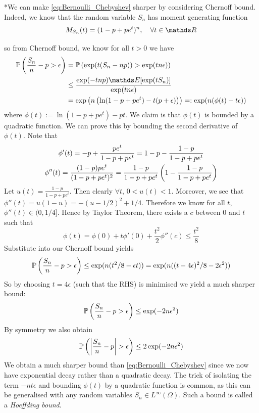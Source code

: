 \begin{unexaminable}
\begin{remark}
*We can make \eqref{eq:Bernoulli_Chebyshev} sharper by considering Chernoff bound. Indeed, we know that the random variable $S_n$ has moment generating function
\begin{equation}
    M_{S_n}(t) = (1-p+pe^t)^n, \quad \forall t \in \R
\end{equation}

so from Chernoff bound, we know for all $t>0$ we have
\begin{align*}
    \p\bracket{\frac{S_n}{n} - p > \epsilon} &= \p\bracket{\exp(t(S_n - np)) > \exp(tn\epsilon)} \\
    &\leq \frac{\exp(-tnp)\E[\exp(tS_n)]}{\exp(tn\epsilon)} \\
    &= \exp\bracket{n \bracket{\ln(1-p+pe^t) - t(p+\epsilon)}} =: \exp(n(\phi(t)-t\epsilon))
\end{align*}
where $\phi(t):= \ln(1-p+pe^t) - pt$. We claim is that $\phi(t)$ is bounded by a quadratic function. We can prove this by bounding the second derivative of $\phi(t)$. Note that
\begin{gather}
    \phi'(t) = -p + \frac{pe^t}{1-p+pe^t} = 1-p-\frac{1-p}{1-p+pe^t} \\
    \phi''(t) = \frac{(1-p)pe^t}{(1-p+pe^t)^2} = \frac{1-p}{1-p+pe^t}\left( 1-\frac{1-p}{1-p+pe^t} \right)
\end{gather}
Let $\displaystyle{u(t) = \frac{1-p}{1-p+pe^t}}$. Then clearly $\forall t, \, 0 < u(t) < 1$. Moreover, we see that $\phi''(t) = u(1-u) = -(u-1/2)^2 + 1/4$. Therefore we know for all $t$, $\phi''(t) \in (0,1/4]$. Hence by Taylor Theorem, there exists a $c$ between $0$ and $t$ such that
\begin{equation}
    \phi(t) = \phi(0) + t\phi'(0) + \frac{t^2}{2}\phi''(c) \leq \frac{t^2}{8} 
\end{equation}
Substitute into our Chernoff bound yields
\begin{equation}
    \mathbb{P}\left( \frac{S_n}{n} - p > \epsilon \right) \leq \exp(n(t^2/8 - \epsilon t)) = \exp(n((t-4\epsilon)^2/8 - 2\epsilon^2))
\end{equation} 
So by choosing $t = 4\epsilon$ (such that the RHS) is minimised we yield a much sharper bound:
\begin{equation}
    \mathbb{P}\left( \frac{S_n}{n} - p > \epsilon \right)  \leq \exp(-2n\epsilon^2)
\end{equation}
By symmetry we also obtain 
\begin{equation} \label{eq:Bernoulli_hoeffding}
    \mathbb{P}\left( \left| \frac{S_n}{n} - p \right| > \epsilon \right) \leq 2\exp(-2n\epsilon^2)
\end{equation}
We obtain a much sharper bound than \eqref{eq:Bernoulli_Chebyshev} since we now have exponential decay rather than a quadratic decay. The trick of isolating the term $-nt\epsilon$ and bounding $\phi(t)$ by a quadratic function is common, as this can be generalised with any random variables $S_n \in L^\infty(\Omega)$. Such a bound is called a \textit{Hoeffding bound}.
\end{remark}
\end{unexaminable}


